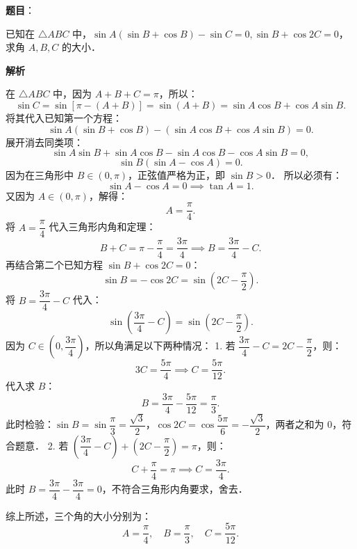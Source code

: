 \begin{answer}

\textbf{题目}：

已知在 $\triangle ABC$ 中，$\sin A(\sin B + \cos B) - \sin C = 0, \sin B + \cos 2C = 0$，求角 $A, B, C$ 的大小．

\textbf{解析}

在 $\triangle ABC$ 中，因为 $A + B + C = \pi$，所以：
\nopagebreak[4]
\[
\sin C = \sin[\pi - (A + B)] = \sin(A + B) = \sin A\cos B + \cos A\sin B.
\]
将其代入已知第一个方程：
\nopagebreak[4]
\[
\sin A(\sin B + \cos B) - (\sin A\cos B + \cos A\sin B) = 0.
\]
展开消去同类项：
\nopagebreak[4]
\[
\sin A\sin B + \sin A\cos B - \sin A\cos B - \cos A\sin B = 0,
\]
\nopagebreak[4]
\[
\sin B(\sin A - \cos A) = 0.
\]
因为在三角形中 $B \in (0, \pi)$，正弦值严格为正，即 $\sin B > 0$．
所以必须有：
\nopagebreak[4]
\[
\sin A - \cos A = 0 \implies \tan A = 1.
\]
又因为 $A \in (0, \pi)$，解得：
\nopagebreak[4]
\[
A = \frac{\pi}{4}.
\]
将 $A = \dfrac{\pi}{4}$ 代入三角形内角和定理：
\nopagebreak[4]
\[
B + C = \pi - \frac{\pi}{4} = \frac{3\pi}{4} \implies B = \frac{3\pi}{4} - C.
\]
再结合第二个已知方程 $\sin B + \cos 2C = 0$：
\nopagebreak[4]
\[
\sin B = -\cos 2C = \sin\left(2C - \frac{\pi}{2}\right).
\]
将 $B = \dfrac{3\pi}{4} - C$ 代入：
\nopagebreak[4]
\[
\sin\left(\frac{3\pi}{4} - C\right) = \sin\left(2C - \frac{\pi}{2}\right).
\]
因为 $C \in \left(0, \dfrac{3\pi}{4}\right)$，所以角满足以下两种情况：
1. 若 $\dfrac{3\pi}{4} - C = 2C - \dfrac{\pi}{2}$，则：
\nopagebreak[4]
\[
3C = \frac{5\pi}{4} \implies C = \frac{5\pi}{12}.
\]
   代入求 $B$：
\nopagebreak[4]
\[
B = \frac{3\pi}{4} - \frac{5\pi}{12} = \frac{\pi}{3}.
\]
   此时检验：$\sin B = \sin \dfrac{\pi}{3} = \dfrac{\sqrt{3}}{2}$，$\cos 2C = \cos \dfrac{5\pi}{6} = -\dfrac{\sqrt{3}}{2}$，两者之和为 0，符合题意．
2. 若 $\left(\dfrac{3\pi}{4} - C\right) + \left(2C - \dfrac{\pi}{2}\right) = \pi$，则：
\nopagebreak[4]
\[
C + \frac{\pi}{4} = \pi \implies C = \frac{3\pi}{4}.
\]
   此时 $B = \dfrac{3\pi}{4} - \dfrac{3\pi}{4} = 0$，不符合三角形内角要求，舍去．

综上所述，三个角的大小分别为：
\nopagebreak[4]
\[
A = \frac{\pi}{4}, \quad B = \frac{\pi}{3}, \quad C = \frac{5\pi}{12}.
\]


\end{answer}
